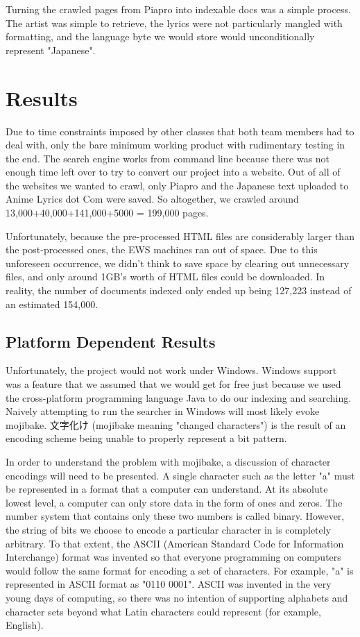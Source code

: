 \documentclass{acm} %
\begin{document}
\begin{CJK}{UTF8}{zhsong}
Turning the crawled pages from Piapro into indexable docs was a simple process. The artist was simple to retrieve, the lyrics were not particularly mangled with formatting, and the language byte we would store would unconditionally represent "Japanese".

\section{Results}

Due to time constraints imposed by other classes that both team members had to deal with, only the bare minimum working product with rudimentary testing in the end. The search engine works from command line because there was not enough time left over to try to convert our project into a website. Out of all of the websites we wanted to crawl, only Piapro and the Japanese text uploaded to Anime Lyrics dot Com were saved. So altogether, we crawled around 13,000+40,000+141,000+5000 = 199,000 pages.

Unfortunately, because the pre-processed HTML files are considerably larger than the post-processed ones, the EWS machines ran out of space. Due to this unforeseen occurrence, we didn't think to save space by clearing out unnecessary files, and only around 1GB's worth of HTML files could be downloaded. In reality, the number of documents indexed only ended up being 127,223 instead of an estimated 154,000.

\subsection{Platform Dependent Results}

Unfortunately, the project would not work under Windows. Windows support was a feature that we assumed that we would get for free just because we used the cross-platform programming language Java to do our indexing and searching. Naively attempting to run the searcher in Windows will most likely evoke mojibake. 文字化け (mojibake meaning "changed characters") is the result of an encoding scheme being unable to properly represent a bit pattern.

In order to understand the problem with mojibake, a discussion of character encodings will need to be presented. A single character such as the letter "a" must be represented in a format that a computer can understand. At its absolute lowest level, a computer can only store data in the form of ones and zeros. The number system that contains only these two numbers is called binary. However, the string of bits we choose to encode a particular character in is completely arbitrary. To that extent, the ASCII (American Standard Code for Information Interchange) format was invented so that everyone programming on computers would follow the same format for encoding a set of characters. For example, "a" is represented in ASCII format as "0110 0001". ASCII was invented in the very young days of computing, so there was no intention of supporting alphabets and character sets beyond what Latin characters could represent (for example, English).


\end{CJK}
\end{document}

